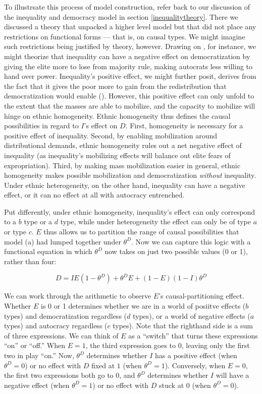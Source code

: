 \documentclass[12pt,]{book}
\begin{document}
To illustrsate this process of model construction, refer back to our discussion of the inequality and democracy model in section \ref{inequalitytheory}. There we discussed a theory that unpacked a higher level model but that did not place any restrictions on functional forms --- that is, on causal types. We might imagine such restrictions being justified by theory, however.
Drawing on \citet{boix2003democracy}, for instance, we might theorize that inequality can have a negative effect on democratization by giving the elite more to lose from majority rule, making autocrats less willing to hand over power. Inequality's positive effect, we might further posit, derives from the fact that it gives the poor more to gain from the redistribution that democratization would enable (\citet{acemoglu2005economic}). However, this positive effect can only unfold to the extent that the masses are able to mobilize, and the capacity to mobilize will hinge on ethnic homogeneity. Ethnic homogeneity thus defines the causal possibilities in regard to \(I\)'s effect on \(D\). First, homogeneity is necessary for a positive effect of inequality. Second, by enabling mobilization around distributional demands, ethnic homogeneity rules out a net negative effect of inequality (as inequality's mobilizing effects will balance out elite fears of expropriation). Third, by making mass mobilization easier in general, ethnic homogeneity makes possible mobilization and democratization \emph{without} inequality. Under ethnic heterogeneity, on the other hand, inequality can have a negative effect, or it can no effect at all with autocracy entrenched.

Put differently, under ethnic homogeneity, inequality's effect can only correspond to a \(b\) type or a \(d\) type, while under heterogeneity the effect can only be of type \(a\) or type \(c\). \(E\) thus allows us to partition the range of causal possibilities that model (a) had lumped together under \(\theta^D\). Now we can capture this logic with a functional equation in which \(\theta^D\) now takes on just two possible values (0 or 1), rather than four:

\begin{equation}
D=IE(1-\theta^D)+\theta^DE+(1-E)(1-I)\theta^D
\end{equation}

We can work through the arithmetic to observe \(E\)'s causal-partitioning effect. Whether \(E\) is 0 or 1 determines whether we are in a world of posiitve effects (\(b\) types) and democratization regardless (\(d\) types), or a world of negative effects (\(a\) types) and autocracy regardless (\(c\) types). Note that the righthand side is a sum of three expressions. We can think of \(E\) as a ``switch'' that turns these expressions ``on'' or ``off.'' When \(E=1\), the third expression goes to 0, leaving only the first two in play ``on.'' Now, \(\theta^D\) determines whether \(I\) has a positive effect (when \(\theta^D=0\)) or no effect with \(D\) fixed at \(1\) (when \(\theta^D=1\)). Conversely, when \(E=0\), the first two expressions both go to \(0\), and \(\theta^D\) determines whether \(I\) will have a negative effect (when \(\theta^D=1\)) or no effect with \(D\) stuck at 0 (when \(\theta^D=0\)).
\end{document}
